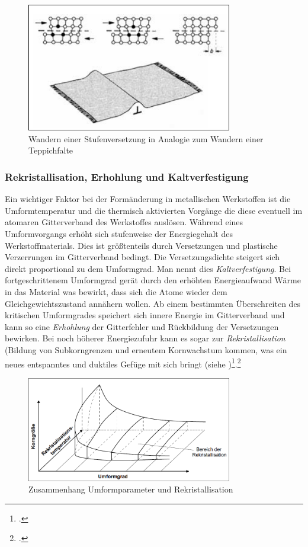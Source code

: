 \documentclass[12pt,a4paper,parskip]{scrartcl}
\begin{document}
{\begin{figure}
\centering
\includegraphics[width=0.8\textwidth]{wandernstufenversetzung}
\caption{Wandern einer Stufenversetzung in Analogie zum Wandern einer Teppichfalte}
\label{fig:wandernstufenversetzung}
\end{figure}

\subsubsection{Rekristallisation, Erhohlung und Kaltverfestigung}
Ein wichtiger Faktor bei der Formänderung in metallischen Werkstoffen ist die Umformtemperatur und die thermisch aktivierten Vorgänge die diese eventuell im atomaren Gitterverband des Werkstoffes auslösen. Während eines Umformvorgangs erhöht sich stufenweise der Energiegehalt des Werkstoffmaterials. Dies ist größtenteils durch Versetzungen und plastische Verzerrungen im Gitterverband bedingt. Die Versetzungsdichte steigert sich direkt proportional zu dem Umformgrad. Man nennt dies \emph{Kaltverfestigung}. Bei fortgeschrittenem Umformgrad gerät durch den erhöhten Energieaufwand Wärme in das Material was bewirkt, dass sich die Atome wieder dem Gleichgewichtszustand annähern wollen. Ab einem bestimmten Überschreiten des kritischen Umformgrades speichert sich innere Energie im Gitterverband und kann so eine \emph{Erhohlung} der Gitterfehler und Rückbildung der Versetzungen bewirken. Bei noch höherer Energiezufuhr kann es sogar zur \emph{Rekristallisation} (Bildung von Subkorngrenzen und erneutem Kornwachstum kommen, was ein neues entspanntes und duktiles Gefüge mit sich bringt (siehe )\footcite[Vgl.][13]{fu}.\footcite[Vgl.][11-13]{fu}
\begin{figure}
\centering
\includegraphics[width=0.8\textwidth]{rekristall}
\caption{Zusammenhang Umformparameter und Rekristallisation}
\label{fig:rekristall}
\end{figure}





}
\end{document}
